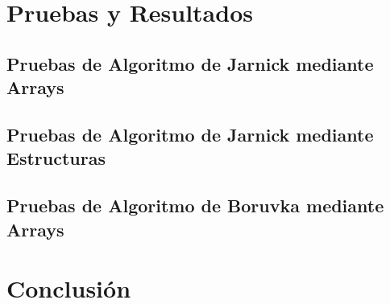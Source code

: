 \documentclass[a4paper]{article}
\begin{document}
\section{Pruebas y Resultados}
\subsection{Pruebas de Algoritmo de Jarnick mediante Arrays}
\subsection{Pruebas de Algoritmo de Jarnick mediante Estructuras}
\subsection{Pruebas de Algoritmo de Boruvka mediante Arrays}
\section{Conclusi\'on}
\end{document}
